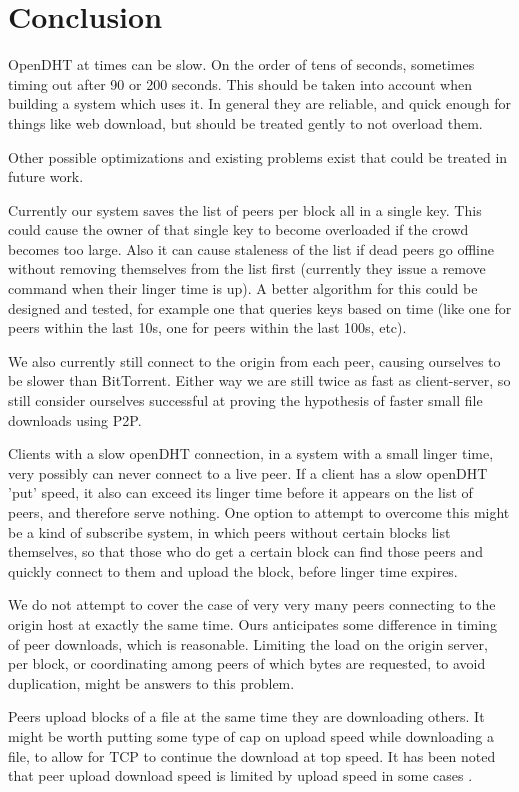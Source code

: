 
\section{Conclusion}
OpenDHT at times can be slow.  On the order of tens of seconds, sometimes timing out after 90 or 200 seconds.  This should be taken into account when building a system which uses it.  In general they are reliable, and quick enough for things like web download, but should be treated gently to not overload them.


Other possible optimizations and existing problems exist that could be treated in future work.

Currently our system saves the list of peers per block all in a single key.  This could cause the owner of that single key to become overloaded if the crowd becomes too large.  Also it can cause staleness of the list if dead peers go offline without removing themselves from the list
first (currently they issue a remove command when their linger time is up).  A better algorithm for this could be designed and tested, for example one that queries keys based on time (like one for peers within the last 10s, one for peers within the last 100s, etc).

We also currently still connect to the origin from each peer, causing ourselves to be slower than BitTorrent.  Either way we are still twice as fast as client-server, so still consider ourselves successful at proving the hypothesis of faster small file downloads using P2P.

Clients with a slow openDHT connection, in a system with a small linger time, very possibly can never connect to a live peer.  If a client has a slow openDHT 'put' speed, it also can exceed its linger time before it appears on the list of peers, and therefore serve nothing.  One option to attempt to overcome this might be a kind of subscribe system, in which peers without certain blocks list themselves, so that those who do get a certain block can find those peers and quickly connect to them and upload the block, before linger time expires. 

We do not attempt to cover the case of very very many peers connecting to the origin host at exactly the same time.  Ours anticipates some difference in timing of peer downloads, which is reasonable. Limiting the load on the origin server, per block, or coordinating among peers of which bytes are requested, to avoid duplication, might be answers to this problem.

Peers upload blocks of a file at the same time they are downloading others.  It might be worth putting some type of cap on upload speed while downloading a file, to allow for TCP to continue the download at top speed.  It has been noted that peer upload download speed is limited by upload speed in some cases \cite{google_note}.

